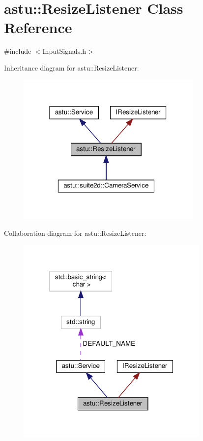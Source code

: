 \hypertarget{classastu_1_1ResizeListener}{}\section{astu\+:\+:Resize\+Listener Class Reference}
\label{classastu_1_1ResizeListener}


{\ttfamily \#include $<$Input\+Signals.\+h$>$}



Inheritance diagram for astu\+:\+:Resize\+Listener\+:\nopagebreak
\begin{figure}[H]
\begin{center}
\leavevmode
\includegraphics[width=258pt]{classastu_1_1ResizeListener__inherit__graph}
\end{center}
\end{figure}


Collaboration diagram for astu\+:\+:Resize\+Listener\+:\nopagebreak
\begin{figure}[H]
\begin{center}
\leavevmode
\includegraphics[width=268pt]{classastu_1_1ResizeListener__coll__graph}
\end{center}
\end{figure}
